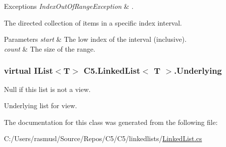 \begin{DoxyExceptions}{Exceptions}
{\em Index\+Out\+Of\+Range\+Exception} & . \\
\hline
\end{DoxyExceptions}


The directed collection of items in a specific index interval.


\begin{DoxyParams}{Parameters}
{\em start} & The low index of the interval (inclusive).\\
\hline
{\em count} & The size of the range.\\
\hline
\end{DoxyParams}
\hypertarget{class_c5_1_1_linked_list_ab397d6b593af94a4467462b2bd3bcf72}{}
\subsubsection[{Underlying}]{\setlength{\rightskip}{0pt plus 5cm}virtual {\bf I\+List}$<$T$>$ {\bf C5.\+Linked\+List}$<$ T $>$.Underlying\hspace{0.3cm}{\ttfamily [get]}}\label{class_c5_1_1_linked_list_ab397d6b593af94a4467462b2bd3bcf72}


Null if this list is not a view. 

Underlying list for view.

The documentation for this class was generated from the following file\+:\begin{DoxyCompactItemize}
\item 
C\+:/\+Users/rasmusl/\+Source/\+Repos/\+C5/\+C5/linkedlists/\hyperlink{_linked_list_8cs}{Linked\+List.\+cs}\end{DoxyCompactItemize}
